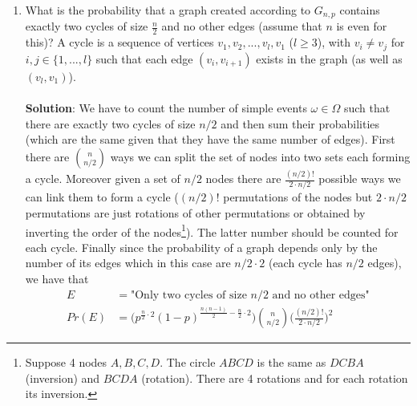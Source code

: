 \documentclass[a4paper]{article}
\begin{document}
\begin{enumerate}
    \item What is the probability that a graph created according to
$G_{n,p}$ contains exactly two cycles of size $\frac{n}{2}$ and no other edges (assume that $n$ is even for this)? A cycle is a sequence of vertices $v_1,v_2, ..., v_l, v_1$ ($l \geq 3$), with $v_i \neq v_j$ for $i,j \in \{1,...,l\}$ such that each edge $(v_i, v_{i+1})$ exists in the graph (as well as $(v_l, v_1)$). \\ \\
    \textbf{Solution}: We have to count the number of simple events $\omega \in \Omega$ such that
    there are exactly two cycles of size $n/2$ and then sum their probabilities (which are the same given that they have the same number of edges). First there are $\binom{n}{n/2}$ ways we can split the set of nodes into two sets each forming a cycle. Moreover given a set of $n/2$ nodes there are $\frac{(n/2)!}{2 \cdot n/2}$ possible ways we can link them to form a cycle ($(n/2)!$ permutations of the nodes but $2 \cdot n/2$ permutations are just rotations of other permutations or obtained by inverting the order of the nodes\footnote{Suppose 4 nodes $A,B,C,D$. The circle $ABCD$ is the same as $DCBA$ (inversion) and $BCDA$ (rotation). There are 4 rotations and for each rotation its inversion.}). The latter number should be counted for each cycle. Finally since the probability of a graph depends only by the number of its edges which in this case are $n/2 \cdot 2$ (each cycle has $n/2$ edges), we have that
    \begin{align*}
        E &= \text{"Only two cycles of size $n/2$ and no other edges"} \\
        Pr(E) &= \bigg( p^{\frac{n}{2}\cdot2} (1-p)^{\frac{n(n-1)}{2} - \frac{n}{2}\cdot2} \bigg) \binom{n}{n/2} \bigg( \frac{(n/2)!}{2 \cdot n/2} \bigg)^2
    \end{align*}
    

\end{enumerate}
\end{document}
